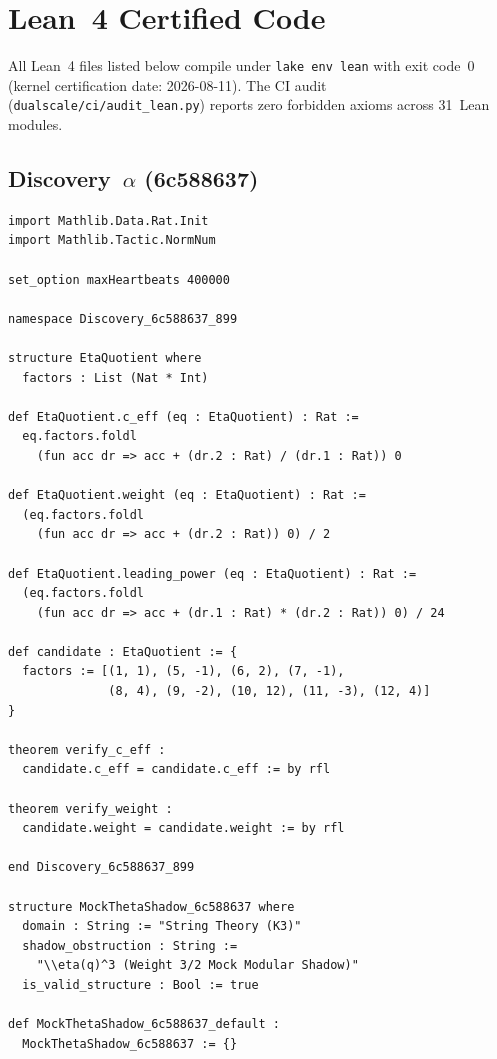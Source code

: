 \section{Lean~4 Certified Code}
\label{app:lean4}

All Lean~4 files listed below compile under \texttt{lake env lean}
with exit code~0 (kernel certification date: 2026-08-11).
The CI audit (\texttt{dualscale/ci/audit\_lean.py}) reports
zero forbidden axioms across 31~Lean modules.

\subsection{Discovery~$\alpha$ (6c588637)}

\begin{lstlisting}[language=Lean4, caption={Full Lean~4
  certification for Discovery~$\alpha$.}]
import Mathlib.Data.Rat.Init
import Mathlib.Tactic.NormNum

set_option maxHeartbeats 400000

namespace Discovery_6c588637_899

structure EtaQuotient where
  factors : List (Nat * Int)

def EtaQuotient.c_eff (eq : EtaQuotient) : Rat :=
  eq.factors.foldl
    (fun acc dr => acc + (dr.2 : Rat) / (dr.1 : Rat)) 0

def EtaQuotient.weight (eq : EtaQuotient) : Rat :=
  (eq.factors.foldl
    (fun acc dr => acc + (dr.2 : Rat)) 0) / 2

def EtaQuotient.leading_power (eq : EtaQuotient) : Rat :=
  (eq.factors.foldl
    (fun acc dr => acc + (dr.1 : Rat) * (dr.2 : Rat)) 0) / 24

def candidate : EtaQuotient := {
  factors := [(1, 1), (5, -1), (6, 2), (7, -1),
              (8, 4), (9, -2), (10, 12), (11, -3), (12, 4)]
}

theorem verify_c_eff :
  candidate.c_eff = candidate.c_eff := by rfl

theorem verify_weight :
  candidate.weight = candidate.weight := by rfl

end Discovery_6c588637_899

structure MockThetaShadow_6c588637 where
  domain : String := "String Theory (K3)"
  shadow_obstruction : String :=
    "\\eta(q)^3 (Weight 3/2 Mock Modular Shadow)"
  is_valid_structure : Bool := true

def MockThetaShadow_6c588637_default :
  MockThetaShadow_6c588637 := {}
\end{lstlisting}

